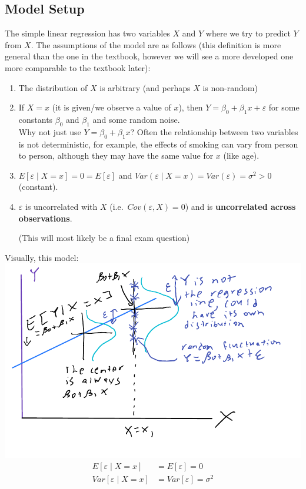 \documentclass[12 pt]{article}
\begin{document}
\subsection{Model Setup}
The simple linear regression has two variables $X$ and $Y$ where we
try to predict $Y$ from $X$. The assumptions of the model are as
follows (this definition is more general than the one in the textbook,
however we will see a more developed one more comparable to the
textbook later):
\begin{enumerate}
\item The distribution of $X$ is arbitrary (and perhaps $X$ is
  non-random)
\item If $X = x$ (it is given/we observe a value of $x$), then $Y =
  \beta_0 + \beta_1 x + \varepsilon$ for some constants $\beta_0$ and
  $\beta_1$ and some random noise.
  \\ Why not just use $Y = \beta_0 + \beta_1 x$? Often the
  relationship between two variables is not deterministic, for
  example, the effects of smoking can vary from person to person,
  although they may have the same value for $x$ (like age).
\item $E[\varepsilon \mid X = x] = 0 = E[\varepsilon]$ and
  $Var(\varepsilon \mid X = x) = Var(\varepsilon) =
  \sigma^2 > 0$ (constant).
\item $\varepsilon$ is uncorrelated with $X$ (i.e.\ $Cov(\varepsilon,
  X) = 0$) and is \textbf{uncorrelated across observations}.

  (This will most likely be a final exam question)
\end{enumerate}
Visually, this model:\\
\includegraphics[width=.9\textwidth]{6.pdf}
\begin{align*}
  E[\varepsilon \mid X = x] & = E[\varepsilon] = 0
  \\ Var[\varepsilon \mid X = x] & = Var[\varepsilon] = \sigma^2
\end{align*}
\end{document}
